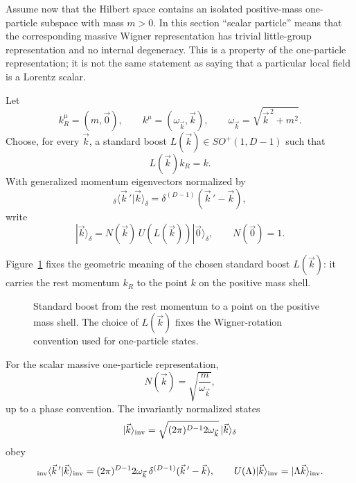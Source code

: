 \begin{definition}
\label{def:kallen-lehmann-scalar-one-particle-normalization-datum}
Assume now that the Hilbert space contains an isolated positive-mass
one-particle subspace with mass \(m>0\). In this section ``scalar particle''
means that the corresponding massive Wigner representation has trivial
little-group representation and no internal degeneracy. This is a property of
the one-particle representation; it is not the same statement as saying that a
particular local field is a Lorentz scalar.

Let
\[
  k_R^\mu=(m,\vec 0),
  \qquad
  k^\mu=(\omega_{\vec k},\vec k),
  \qquad
  \omega_{\vec k}=\sqrt{\vec k^{\,2}+m^2}.
\]
Choose, for every \(\vec k\), a standard boost \(L(\vec k)\in SO^+(1,D-1)\)
such that
\[
  L(\vec k)k_R=k.
\]
With generalized momentum eigenvectors normalized by
\[
  {}_\delta\langle\vec k\,{}'|\vec k\rangle_\delta
  =
  \delta^{(D-1)}(\vec k\,{}'-\vec k),
\]
write
\[
  |\vec k\rangle_\delta
  =
  N(\vec k)\,U(L(\vec k))|\vec 0\rangle_\delta,
  \qquad
  N(\vec 0)=1.
\]
\end{definition}

Figure~\ref{fig:standard-boost-positive-mass-shell} fixes the geometric meaning
of the chosen standard boost \(L(\vec k)\): it carries the rest momentum
\(k_R\) to the point \(k\) on the positive mass shell.

\begin{figure}[H]
\centering
{}
\caption{Standard boost from the rest momentum to a point on the positive mass
shell.  The choice of \(L(\vec k)\) fixes the Wigner-rotation convention used
for one-particle states.}
\label{fig:standard-boost-positive-mass-shell}
\end{figure}

\begin{lemma}
\label{lem:kallen-lehmann-one-particle-state-normalization}
For the scalar massive one-particle representation,
\[
  N(\vec k)=\sqrt{\frac{m}{\omega_{\vec k}}},
\]
up to a phase convention.  The invariantly normalized states
\[
  |\vec k\rangle_{\rm inv}
  =
  \sqrt{(2\pi)^{D-1}2\omega_{\vec k}}\,
  |\vec k\rangle_\delta
\]
obey
\[
  {}_{\rm inv}\langle\vec k\,{}'|\vec k\rangle_{\rm inv}
  =
  (2\pi)^{D-1}2\omega_{\vec k}\,
  \delta^{(D-1)}(\vec k\,{}'-\vec k),
  \qquad
  U(\Lambda)|\vec k\rangle_{\rm inv}=|\Lambda\vec k\rangle_{\rm inv}.
\]
\end{lemma}

